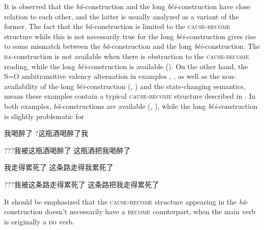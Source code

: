 \documentclass[UTF8, a4paper, oneside, scheme=plain, 12pt]{ctexrep}
\newcommand{\form}[1]{\emph{#1}}
\newcommand*{\category}[1]{\textsc{#1}}
\begin{document}
It is observed that the \form{bǎ}-construction
and the long \form{bèi}-construction
have close relation to each other, 
and the latter is usually analyzed 
as a variant of the former.
The fact that the \form{bǎ}-construction
is limited to the \category{cause}-\category{become} structure
while this is not necessarily true for the long \form{bèi}-construction
gives rise to some mismatch between the \form{bǎ}-construction
and the long \form{bèi}-construction.
The \category{ba}-construction is not available 
when there is obstruction to the 
\category{cause}-\category{become} reading,
while the long \form{bèi}-construction is available
().
On the other hand,
the S=O ambitransitive valency alternation 
in examples , ,
as well as the non-availability of the long \form{bèi}-construction
(, )
and the state-changing semantics,
means these examples contain a typical \category{cause}-\category{become} structure 
described in .
In both examples, 
\form{bǎ}-constructions are available 
(, ),
while the long \form{bèi}-construction 
is slightly problematic for 

\begin{exe}
    \ex\label{ex:verb-phrase.ba.cause.1} \begin{xlist}
        \ex 我喝醉了
        \ex ?这瓶酒喝醉了我
    \end{xlist}
    \ex\label{ex:verb-phrase.ba.bei-1} ???我被这瓶酒喝醉了
    \ex\label{ex:verb-phrase.ba.ba-1} 这瓶酒把我喝醉了
\end{exe}

\begin{exe}
    \ex\label{ex:verb-phrase.ba.cause.2} \begin{xlist}
        \ex 我走得累死了
        \ex 这条路走得我累死了
    \end{xlist}
    \ex\label{ex:verb-phrase.ba.bei-2} ???我被这条路走得累死了
    \ex\label{ex:verb-phrase.ba.ba-2} 这条路把我走得累死了
\end{exe}


It should be emphasized that the \category{cause}-\category{become} structure 
appearing in the \form{bǎ}-construction 
doesn't necessarily have a \category{become} counterpart,
when the main verb is originally a \category{do} verb.
\end{document}
